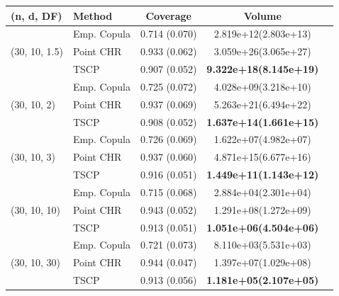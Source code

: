 \begin{tabular}{l l c c c}
\toprule
(n, d, DF) & Method & Coverage & Volume \\
\midrule
\multirow{3}{*}{(30, 10, 1.5)} 
& Emp. Copula & \color{red}0.714 (0.070) & 2.819e+12(2.803e+13)  \\
& Point CHR & 0.933 (0.062) & 3.059e+26(3.065e+27)  \\
& TSCP & 0.907 (0.052) & \textbf{9.322e+18(8.145e+19)} \\

\midrule
\multirow{3}{*}{(30, 10, 2)} 
& Emp. Copula & \color{red}0.725 (0.072) & 4.028e+09(3.218e+10)  \\
& Point CHR & 0.937 (0.069) & 5.263e+21(6.494e+22)  \\
& TSCP & 0.908 (0.052) & \textbf{1.637e+14(1.661e+15)}  \\

\midrule
\multirow{3}{*}{(30, 10, 3)} 
& Emp. Copula & \color{red}0.726 (0.069) & 1.622e+07(4.982e+07)  \\
& Point CHR & 0.937 (0.060) & 4.871e+15(6.677e+16) \\
& TSCP & 0.916 (0.051) & \textbf{1.449e+11(1.143e+12)}  \\

\midrule
\multirow{3}{*}{(30, 10, 10)}
& Emp. Copula & \color{red}0.715 (0.068) & 2.884e+04(2.301e+04)  \\
& Point CHR & 0.943 (0.052) & 1.291e+08(1.272e+09)  \\
& TSCP & 0.913 (0.051) & \textbf{1.051e+06(4.504e+06)}  \\

\midrule
\multirow{3}{*}{(30, 10, 30)}
& Emp. Copula & \color{red}0.721 (0.073) & 8.110e+03(5.531e+03)  \\
& Point CHR & 0.944 (0.047) & 1.397e+07(1.029e+08)  \\
& TSCP & 0.913 (0.056) & \textbf{1.181e+05(2.107e+05)}  \\

\bottomrule
\end{tabular}
